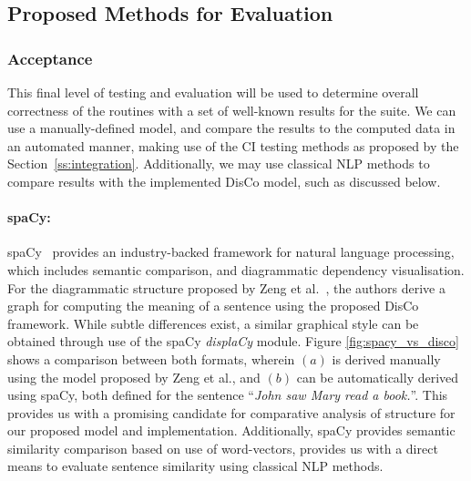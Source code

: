 
\subsection{Proposed Methods for Evaluation}
\label{sec:proposed_methods_for_evaluation}

\subsubsection{Acceptance}\label{ss:acceptance}
This final level of testing and evaluation will be used to determine overall correctness of the routines with a set of well-known results for the suite. We can use a manually-defined model, and compare the results to the computed data in an automated manner, making use of the CI testing methods as proposed by the Section~\ref{ss:integration}. Additionally, we may use classical NLP methods to compare results with the implemented DisCo model, such as discussed below.


\paragraph{spaCy:}
spaCy~\cite{spacy2} provides an industry-backed framework for natural language processing, which includes semantic comparison, and diagrammatic dependency visualisation. For the diagrammatic structure proposed by Zeng et al.~\cite[Example 5.3]{Zeng_Coecke_2016}, the authors derive a graph for computing the meaning of a sentence using the proposed DisCo framework. While subtle differences exist, a similar graphical style can be obtained through use of the spaCy \textit{displaCy} module. Figure \ref{fig:spacy_vs_disco} shows a comparison between both formats, wherein $(a)$ is derived manually using the model proposed by Zeng et al., and $(b)$ can be automatically derived using spaCy, both defined for the sentence ``\textit{John saw Mary read a book.}''. This provides us with a promising candidate for comparative analysis of structure for our proposed model and implementation. Additionally, spaCy provides semantic similarity comparison based on use of word-vectors, provides us with a direct means to evaluate sentence similarity using classical NLP methods. 


